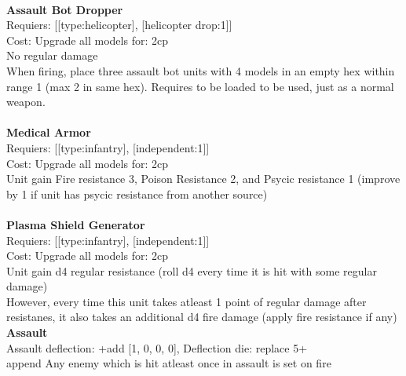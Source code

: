 \ \\
{\bf Assault Bot Dropper } \\

Requiers: [[type:helicopter], [helicopter drop:1]] \\
Cost: Upgrade all models for: 2cp \\
No regular damage\\ 
When firing, place three assault bot units with 4 models in an empty hex within range 1 (max 2 in same hex). Requires to be loaded to be used, just as a normal weapon.\\ 









\ \\
{\bf Medical Armor } \\

Requiers: [[type:infantry], [independent:1]] \\
Cost: Upgrade all models for: 2cp \\
Unit gain Fire resistance 3, Poison Resistance 2, and Psycic resistance 1 (improve by 1 if unit has psycic resistance from another source)\\ 









\ \\
{\bf Plasma Shield Generator } \\

Requiers: [[type:infantry], [independent:1]] \\
Cost: Upgrade all models for: 2cp \\
Unit gain d4 regular resistance (roll d4 every time it is hit with some regular damage)\\ 
However, every time this unit takes atleast 1 point of regular damage after resistanes, it also takes an additional d4 fire damage (apply fire resistance if any)\\ 




{\bf Assault} \ \\
Assault deflection: +add [1, 0, 0, 0], Deflection die: replace 5+
\\ 

append Any enemy which is hit atleast once in assault is set on fire


